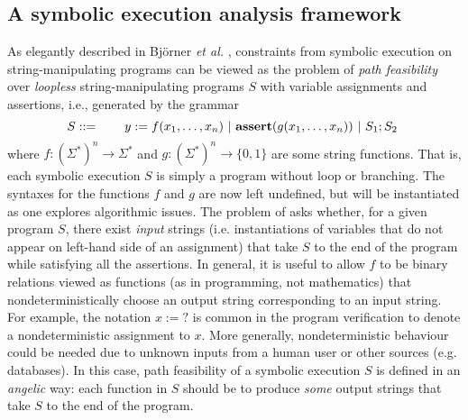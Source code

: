 \subsection{A symbolic execution analysis framework}
As elegantly described in Bj\"{o}rner \emph{et al.} \cite{BTV09}, constraints 
from symbolic 
execution on string-manipulating programs can be viewed as the problem of \emph{path 
feasibility} over \emph{loopless} string-manipulating programs $S$ with variable
assignments and assertions, i.e., generated by the grammar
\begin{equation*}
    S ::= \qquad y := f(x_1,\ldots,x_n) \ |\ \text{\ASSERT{$g(x_1,\ldots,x_n)$}}\ |\ 
            S_1; S_2\ 
\end{equation*}
where $f: (\Sigma^*)^n \to \Sigma^*$ and $g: (\Sigma^*)^n \to \{0,1\}$ are
some string functions. That is, each symbolic execution $S$ is simply a program 
without loop or branching. 
The syntaxes for the functions $f$ and $g$ are now
left undefined, but will be instantiated as one explores algorithmic issues.
The problem of \defn{path feasibility}
asks whether, for a given program $S$, there exist \emph{input} strings (i.e. 
instantiations of variables that do not appear on left-hand side of an 
assignment) that take
$S$ to the end of the program while satisfying all the assertions. 
In general, it is useful to allow $f$ to be %
binary relations viewed as functions (as in programming, not mathematics) that 
nondeterministically choose an output string corresponding to an input string. 
For example, the 
notation $x := ?$ is common in the program verification to 
denote a nondeterministic assignment to $x$. More generally, nondeterministic
behaviour could be needed due to unknown inputs from a human user or other 
sources (e.g. databases). In this case, path feasibility of a
symbolic execution $S$
is defined in an \emph{angelic} way: each function in $S$
should be to produce \emph{some} output strings that take $S$ to the end of the
program.

